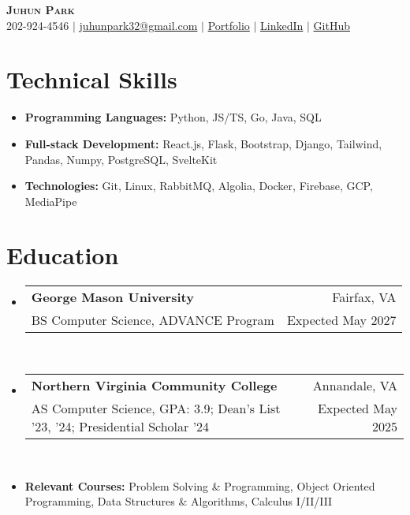 \documentclass[letterpaper,11pt]{article}
\makeatletter
\newcommand{\resumeItem}[1]{
  \item\small{
    {#1 \vspace{0pt}}
  }
}
\newcommand{\resumeItemThin}[1]{
  \item\small{
    {#1 \vspace{-5pt}}
  }
}
\newcommand{\resumeSubheading}[4]{
    \item
    \begin{tabular*}{0.985\textwidth}[t]{l@{\extracolsep{\fill}}r@{\hspace{-0.1in}}}
        \small{\textbf{#1}} & \small{#2} \\
        \small#3 & \small #4 \\
    \end{tabular*}\vspace{-5pt}
}
\newcommand{\resumeSubHeadingListStart}{\begin{itemize}[leftmargin=0.00in, rightmargin=-0.2in, label={}]\vspace{1pt}}
\newcommand{\resumeSubHeadingListEnd}{\end{itemize}\vspace{-7pt}}
\newcommand{\resumeItemListStart}{\begin{itemize}[leftmargin=0.15in, rightmargin=0.15in]}
\newcommand{\resumeItemListEnd}{\end{itemize}\vspace{-7pt}}
\makeatother
\begin{document}

\begin{center}
  \textbf{\Huge \scshape {Juhun Park}} \\ \vspace{1pt}
  \small 202-924-4546 $|$
  \href{mailto:riann3207@gmail.com}{juhunpark32@gmail.com} $|$
  \href{https://juhun-park.web.app/}{Portfolio} $|$
  \href{https://linkedin.com/in/juhun-park}{LinkedIn} $|$
  \href{https://github.com/juhun32}{GitHub} \\
\end{center}

\vspace{-10pt}


\section{Technical Skills}
\vspace{3pt}
\resumeItemListStart
\resumeItemThin{\textbf{Programming Languages: }{Python, JS/TS, Go, Java, SQL}}\\
\resumeItemThin{\textbf{Full-stack Development: }{React.js, Flask, Bootstrap, Django, Tailwind, Pandas, Numpy, PostgreSQL, SvelteKit}}\\
\resumeItemThin{\textbf{Technologies: }{Git, Linux, RabbitMQ, Algolia, Docker, Firebase, GCP, MediaPipe}}\\
\resumeItemListEnd


\section{Education}
\resumeSubHeadingListStart
\resumeSubheading
{George Mason University}{Fairfax, VA}
{BS Computer Science, ADVANCE Program}{Expected May 2027}\\

\resumeSubheading
{Northern Virginia Community College}{Annandale, VA}
{AS Computer Science, GPA: 3.9; Dean's List '23, '24; Presidential Scholar '24}{Expected May 2025} \\

\resumeItem{\textbf{Relevant Courses: }{Problem Solving \& Programming, Object Oriented Programming, Data Structures \& Algorithms, Calculus I/II/III}}
\resumeSubHeadingListEnd
\vspace{-3pt}

\end{document}
